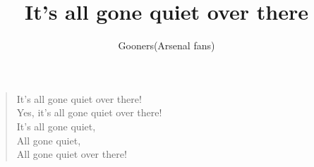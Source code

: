 \documentclass[a4paper,12pt]{article}
\title{It's all gone quiet over there}
\author{Gooners(Arsenal fans)}
\date{}
\begin{document}
	
	\maketitle
	
	\begin{verse}
		
		It's all gone quiet over there! \\
		Yes, it's all gone quiet over there! \\
		It's all gone quiet, \\
		All gone quiet, \\
		All gone quiet over there!
		
	\end{verse}
	
\end{document}
